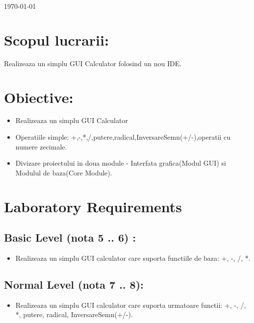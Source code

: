\documentclass[12pt]{article}
\begin{document}
\begin{titlepage}

{\large \today}\\[2cm] %


\vfill %

\end{titlepage}
\section{Scopul lucrarii:}
Realizeaza un simplu GUI Calculator folosind  un nou IDE.
\section{Obiective:}
\begin{itemize}
\item Realizeaza un simplu GUI Calculator
\item Operatiile simple: +,-,*,/,putere,radical,InversareSemn(+/-),operatii cu numere zecimale.
\item Divizare proiectului in doua module - Interfata grafica(Modul GUI) si Modulul de baza(Core Module).
\end{itemize}
\section{Laboratory Requirements}
\label{sec:examples}

\subsection{Basic Level (nota 5 .. 6) :}
\begin{itemize}
\item Realizeaza un simplu GUI calculator care suporta functiile de baza: +, -, /, *.
\end{itemize}


\subsection{Normal Level (nota 7 .. 8):}
\begin{itemize}
\item Realizeaza un simplu GUI calculator care suporta urmatoare functii: +, -, /, *, putere, radical, InversareSemn(+/-).
\end{itemize}
\end{document}
